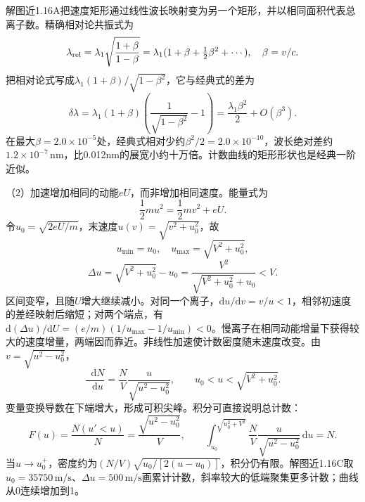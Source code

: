 \documentclass[UTF8,fontset=fandol,a4paper,11pt]{ctexart}
\newcommand{\dd}{\mathop{}\!\mathrm{d}}
\begin{document}
解图近1.16A把速度矩形通过线性波长映射变为另一个矩形，并以相同面积代表总离子数。精确相对论共振式为
\[
\lambda_{\rm rel}=\lambda_1\sqrt{\frac{1+\beta}{1-\beta}}
=\lambda_1(1+\beta+\tfrac12\beta^2+\cdots),\quad\beta=v/c.
\]
把相对论式写成$\lambda_1(1+\beta)/\sqrt{1-\beta^2}$，它与经典式的差为
\[
\delta\lambda=\lambda_1(1+\beta)\left(\frac1{\sqrt{1-\beta^2}}-1\right)
=\frac{\lambda_1\beta^2}{2}+O(\beta^3).
\]
在最大$\beta=2.0\times10^{-5}$处，经典式相对少约$\beta^2/2=2.0\times10^{-10}$，波长绝对差约$1.2\times10^{-7}\,\mathrm{nm}$，比0.012nm的展宽小约十万倍。计数曲线的矩形形状也是经典一阶近似。

（2）加速增加相同的动能$eU$，而非增加相同速度。能量式为
\[
\frac12mu^2=\frac12mv^2+eU.
\]
令$u_0=\sqrt{2eU/m}$，末速度$u(v)=\sqrt{v^2+u_0^2}$，故
\[
u_{\min}=u_0,\quad u_{\max}=\sqrt{V^2+u_0^2},
\]
\[
\boxed{\Delta u=\sqrt{V^2+u_0^2}-u_0
=\frac{V^2}{\sqrt{V^2+u_0^2}+u_0}<V}.
\]
区间变窄，且随$U$增大继续减小。对同一个离子，$\mathrm du/\mathrm dv=v/u<1$，相邻初速度的差经映射后缩短；对两个端点，有$\mathrm d(\Delta u)/\mathrm dU=(e/m)(1/u_{\max}-1/u_{\min})<0$。慢离子在相同动能增量下获得较大的速度增量，两端因而靠近。非线性加速使计数密度随末速度改变。由$v=\sqrt{u^2-u_0^2}$，
\[
\frac{\dd N}{\dd u}=\frac NV\frac{u}{\sqrt{u^2-u_0^2}},
\qquad u_0<u<\sqrt{V^2+u_0^2}.
\]
变量变换导数在下端增大，形成可积尖峰。积分可直接说明总计数：
\[
F(u)=\frac{N(u'<u)}N=\frac{\sqrt{u^2-u_0^2}}V,\qquad
\int_{u_0}^{\sqrt{u_0^2+V^2}}\frac NV\frac u{\sqrt{u^2-u_0^2}}\,\mathrm du=N.
\]
当$u\to u_0^+$，密度约为$(N/V)\sqrt{u_0/[2(u-u_0)]}$，积分仍有限。解图近1.16C取$u_0=35750\,\mathrm{m/s}$、$\Delta u=500\,\mathrm{m/s}$画累计计数，斜率较大的低端聚集更多计数；曲线从0连续增加到1。
\end{document}
